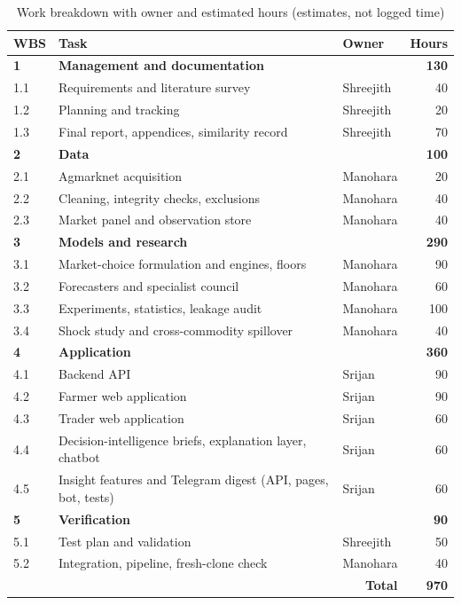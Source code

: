\begin{table}[!t]
\centering
\caption{Work breakdown with owner and estimated hours (estimates, not logged time)}
\label{tab:wbs}
\small
\begin{tabular}{|l|p{6.2cm}|l|r|}
\hline
\textbf{WBS} & \textbf{Task} & \textbf{Owner} & \textbf{Hours} \\ \hline
\textbf{1} & \textbf{Management and documentation} & & \textbf{130} \\
1.1 & Requirements and literature survey & Shreejith & 40 \\
1.2 & Planning and tracking & Shreejith & 20 \\
1.3 & Final report, appendices, similarity record & Shreejith & 70 \\ \hline
\textbf{2} & \textbf{Data} & & \textbf{100} \\
2.1 & Agmarknet acquisition & Manohara & 20 \\
2.2 & Cleaning, integrity checks, exclusions & Manohara & 40 \\
2.3 & Market panel and observation store & Manohara & 40 \\ \hline
\textbf{3} & \textbf{Models and research} & & \textbf{290} \\
3.1 & Market-choice formulation and engines, floors & Manohara & 90 \\
3.2 & Forecasters and specialist council & Manohara & 60 \\
3.3 & Experiments, statistics, leakage audit & Manohara & 100 \\
3.4 & Shock study and cross-commodity spillover & Manohara & 40 \\ \hline
\textbf{4} & \textbf{Application} & & \textbf{360} \\
4.1 & Backend API & Srijan & 90 \\
4.2 & Farmer web application & Srijan & 90 \\
4.3 & Trader web application & Srijan & 60 \\
4.4 & Decision-intelligence briefs, explanation layer, chatbot & Srijan & 60 \\ \hline
4.5 & Insight features and Telegram digest (API, pages, bot, tests) & Srijan & 60 \\ \hline
\textbf{5} & \textbf{Verification} & & \textbf{90} \\
5.1 & Test plan and validation & Shreejith & 50 \\
5.2 & Integration, pipeline, fresh-clone check & Manohara & 40 \\ \hline
\multicolumn{3}{|r|}{\textbf{Total}} & \textbf{970} \\ \hline
\end{tabular}
\end{table}

